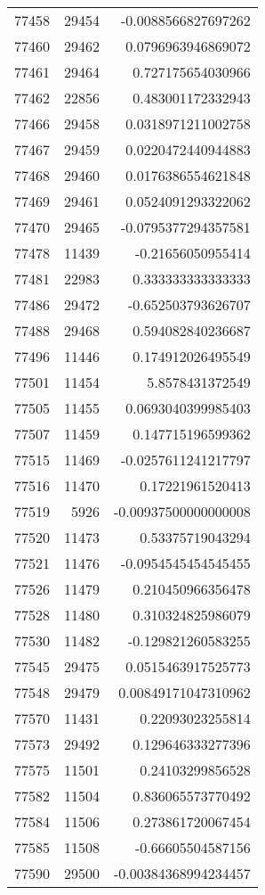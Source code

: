 \begin{tabular}{r | r | r}
77458 & 29454 & -0.0088566827697262 \\
77460 & 29462 & 0.0796963946869072 \\
77461 & 29464 & 0.727175654030966 \\
77462 & 22856 & 0.483001172332943 \\
77466 & 29458 & 0.0318971211002758 \\
77467 & 29459 & 0.0220472440944883 \\
77468 & 29460 & 0.0176386554621848 \\
77469 & 29461 & 0.0524091293322062 \\
77470 & 29465 & -0.0795377294357581 \\
77478 & 11439 & -0.21656050955414 \\
77481 & 22983 & 0.333333333333333 \\
77486 & 29472 & -0.652503793626707 \\
77488 & 29468 & 0.594082840236687 \\
77496 & 11446 & 0.174912026495549 \\
77501 & 11454 & 5.8578431372549 \\
77505 & 11455 & 0.0693040399985403 \\
77507 & 11459 & 0.147715196599362 \\
77515 & 11469 & -0.0257611241217797 \\
77516 & 11470 & 0.17221961520413 \\
77519 & 5926 & -0.00937500000000008 \\
77520 & 11473 & 0.53375719043294 \\
77521 & 11476 & -0.0954545454545455 \\
77526 & 11479 & 0.210450966356478 \\
77528 & 11480 & 0.310324825986079 \\
77530 & 11482 & -0.129821260583255 \\
77545 & 29475 & 0.0515463917525773 \\
77548 & 29479 & 0.00849171047310962 \\
77570 & 11431 & 0.22093023255814 \\
77573 & 29492 & 0.129646333277396 \\
77575 & 11501 & 0.24103299856528 \\
77582 & 11504 & 0.836065573770492 \\
77584 & 11506 & 0.273861720067454 \\
77585 & 11508 & -0.66605504587156 \\
77590 & 29500 & -0.00384368994234457 \\

\end{tabular}
